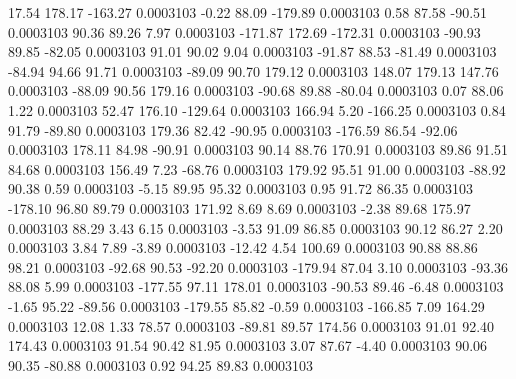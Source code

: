        17.54      178.17     -163.27     0.0003103
       -0.22       88.09     -179.89     0.0003103
        0.58       87.58      -90.51     0.0003103
       90.36       89.26        7.97     0.0003103
     -171.87      172.69     -172.31     0.0003103
      -90.93       89.85      -82.05     0.0003103
       91.01       90.02        9.04     0.0003103
      -91.87       88.53      -81.49     0.0003103
      -84.94       94.66       91.71     0.0003103
      -89.09       90.70      179.12     0.0003103
      148.07      179.13      147.76     0.0003103
      -88.09       90.56      179.16     0.0003103
      -90.68       89.88      -80.04     0.0003103
        0.07       88.06        1.22     0.0003103
       52.47      176.10     -129.64     0.0003103
      166.94        5.20     -166.25     0.0003103
        0.84       91.79      -89.80     0.0003103
      179.36       82.42      -90.95     0.0003103
     -176.59       86.54      -92.06     0.0003103
      178.11       84.98      -90.91     0.0003103
       90.14       88.76      170.91     0.0003103
       89.86       91.51       84.68     0.0003103
      156.49        7.23      -68.76     0.0003103
      179.92       95.51       91.00     0.0003103
      -88.92       90.38        0.59     0.0003103
       -5.15       89.95       95.32     0.0003103
        0.95       91.72       86.35     0.0003103
     -178.10       96.80       89.79     0.0003103
      171.92        8.69        8.69     0.0003103
       -2.38       89.68      175.97     0.0003103
       88.29        3.43        6.15     0.0003103
       -3.53       91.09       86.85     0.0003103
       90.12       86.27        2.20     0.0003103
        3.84        7.89       -3.89     0.0003103
      -12.42        4.54      100.69     0.0003103
       90.88       88.86       98.21     0.0003103
      -92.68       90.53      -92.20     0.0003103
     -179.94       87.04        3.10     0.0003103
      -93.36       88.08        5.99     0.0003103
     -177.55       97.11      178.01     0.0003103
      -90.53       89.46       -6.48     0.0003103
       -1.65       95.22      -89.56     0.0003103
     -179.55       85.82       -0.59     0.0003103
     -166.85        7.09      164.29     0.0003103
       12.08        1.33       78.57     0.0003103
      -89.81       89.57      174.56     0.0003103
       91.01       92.40      174.43     0.0003103
       91.54       90.42       81.95     0.0003103
        3.07       87.67       -4.40     0.0003103
       90.06       90.35      -80.88     0.0003103
        0.92       94.25       89.83     0.0003103
